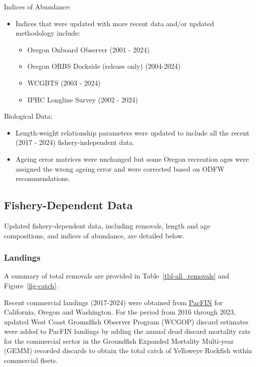 \documentclass[
]{scrartcl}
\providecommand{\tightlist}{%
  \setlength{\itemsep}{0pt}\setlength{\parskip}{0pt}}\usepackage{longtable,booktabs,array}
\begin{document}
Indices of Abundance:

\begin{itemize}
\tightlist
\item
  Indices that were updated with more recent data and/or updated
  methodology include:

  \begin{itemize}
  \tightlist
  \item
    Oregon Onboard Observer (2001 - 2024)
  \item
    Oregon ORBS Dockside (release only) (2004-2024)
  \item
    WCGBTS (2003 - 2024)
  \item
    IPHC Longline Survey (2002 - 2024)
  \end{itemize}
\end{itemize}

Biological Data:

\begin{itemize}
\tightlist
\item
  Length-weight relationship parameters were updated to include all the
  recent (2017 - 2024) fishery-independent data.
\item
  Ageing error matrices were unchanged but some Oregon recreation ages
  were assigned the wrong ageing error and were corrected based on ODFW
  recommendations.
\end{itemize}

\subsection{Fishery-Dependent Data}\label{fishery-dependent-data}

Updated fishery-dependent data, including removals, length and age
compositions, and indices of abundance, are detailed below.

\subsubsection{Landings}\label{landings}

A summary of total removals are provided in Table~\ref{tbl-all_removals}
and Figure~\ref{fig-catch}.

Recent commercial landings (2017-2024) were obtained from
\href{www.pacfin.psmfc.org}{PacFIN} for California, Oregon and
Washington. For the period from 2016 through 2023, updated West Coast
Groundfish Observer Program (WCGOP) discard estimates were added to
PacFIN landings by adding the annual dead discard mortality rate for the
commercial sector in the Groundfish Expanded Mortality Multi-year (GEMM)
recorded discards to obtain the total catch of Yelloweye Rockfish within
commercial fleets.
\end{document}

